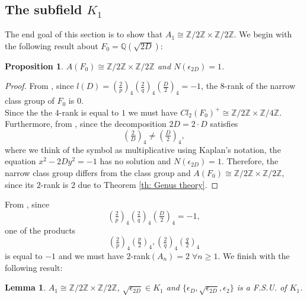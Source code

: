\documentclass{article}
\numberwithin{equation}{section}
\theoremstyle{plain}  %
\newtheorem{lemma}{Lemma}[section]
\newtheorem{proposition}{Proposition}[section]
\theoremstyle{definition}
\newcommand{\Z}{\mathbb{Z}}
\newcommand{\Q}{\mathbb{Q}}
\newcommand{\kron}[2]{\left( \tfrac{#1}{#2} \right)}
\begin{document}
\subsection{The subfield \texorpdfstring{$K_1$}{K1}}

The end goal of this section is to show that $A_1 \cong \Z / 2 \Z \times \Z / 2 \Z$. We begin with the following result about $F_0 = \Q(\sqrt{2D})$:

\begin{proposition}
    $A(F_0) \cong \Z / 2 \Z \times \Z / 2 \Z $ and $N(\epsilon_{2D})=1$. 
\end{proposition}

\begin{proof}
    From \cite[Proposition~B2]{MR309898}, since $l(D) = \kron{2}{p}_4 \kron{2}{q}_4 \kron{D}{2}_4= -1$, the $8$-rank of the narrow class group of $F_0$ is $0$.\\ 
    
    Since the the $4$-rank is equal to $1$ we must have $Cl_{2}(F_0)^{+} \cong \Z / 2 \Z \times \Z / 4 \Z$. Furthermore, from \cite[Corollary~1]{MR309898}, since the decomposition $2D= 2 \cdot D$ satisfies 
    $$\kron{2}{D}_4 \neq \kron{D}{2}_4,$$
    where we think of the symbol as multiplicative using Kaplan's notation, the equation $x^2-2Dy^2=-1$ has no solution and $N(\epsilon_{2D})=1$. Therefore, the narrow class group differs from the class group and $A(F_0) \cong \Z / 2 \Z \times \Z / 2 \Z $, since its $2$-rank is $2$ due to Theorem \ref{th: Genus theory}.
\end{proof}

From \cite[Theorem~3.2]{MR2783388}, since $$ \kron{2}{p}_4 \kron{2}{q}_4 \kron{D}{2}_4= -1,$$ one of the products $$ \kron{2}{p}_4  \kron{p}{2}_4,\kron{2}{q}_4 \kron{q}{2}_4$$ 
is equal to $-1$ and we must have $2$-rank$(A_n)=2 \; \forall n \geq 1$.  We finish with the following result:

\begin{lemma} \label{lem: A1=C2xC2}
    $A_1 \cong \Z / 2 \Z \times \Z / 2 \Z$, $\sqrt{\epsilon_{2D}} \in K_1$ and $\{ \epsilon_D, \sqrt{\epsilon_{2D}}, \epsilon_2 \}$ is a F.S.U. of $K_1$. 
\end{lemma}
\end{document}
